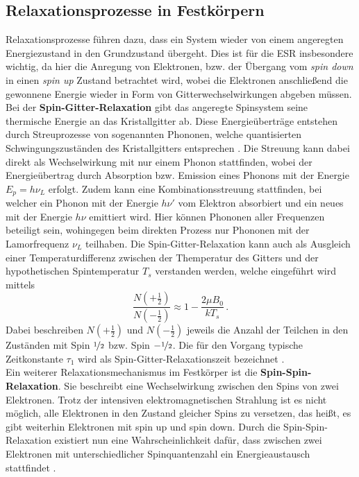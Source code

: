 \documentclass{scrartcl}
\begin{document}
\subsection{Relaxationsprozesse in Festkörpern}
Relaxationsprozesse führen dazu, dass ein System wieder von einem angeregten Energiezustand in den Grundzustand übergeht. Dies ist für die ESR insbesondere wichtig, da hier die Anregung von Elektronen, bzw. der Übergang vom \textit{spin down} in einen \textit{spin up} Zustand betrachtet wird, wobei die Elektronen anschließend die gewonnene Energie wieder in Form von Gitterwechselwirkungen abgeben müssen.  \\

Bei der \textbf{Spin-Gitter-Relaxation} gibt das angeregte Spinsystem seine thermische Energie an das Kristallgitter ab. Diese Energieüberträge entstehen durch Streuprozesse von sogenannten Phononen, welche quantisierten Schwingungszuständen des Kristallgitters entsprechen \cite{Grundlagen}. Die Streuung kann dabei direkt als Wechselwirkung mit nur einem Phonon stattfinden, wobei der Energieübertrag durch Absorption bzw. Emission eines Phonons mit der Energie $E_p = h \nu_L$ erfolgt. Zudem kann eine Kombinationsstreuung stattfinden, bei welcher ein Phonon mit der Energie $h \nu'$ vom Elektron absorbiert und ein neues mit der Energie $h \nu$ emittiert wird. Hier können Phononen aller Frequenzen beteiligt sein, wohingegen beim direkten Prozess nur Phononen mit der Lamorfrequenz $\nu_L$ teilhaben. Die Spin-Gitter-Relaxation kann auch als Ausgleich einer Temperaturdifferenz zwischen der Themperatur des Gitters und der hypothetischen Spintemperatur $T_s$ verstanden werden, welche eingeführt wird mittels
\begin{equation}
    \frac{N(+\frac{1}{2})}{N(-\frac{1}{2})} \approx 1 - \frac{2 \mu B_0}{k T_s} \, .
\end{equation}
Dabei beschreiben $N(+\frac{1}{2})$ und $N(-\frac{1}{2})$ jeweils die Anzahl der Teilchen in den Zuständen mit Spin $\nicefrac{1}{2}$ bzw. Spin $-\nicefrac{1}{2}$. Die für den Vorgang typische Zeitkonstante $\tau_1$ wird als Spin-Gitter-Relaxationszeit bezeichnet \cite{Grundlagen}. 
\\

Ein weiterer Relaxationsmechanismus im Festkörper ist die \textbf{Spin-Spin-Relaxation}. Sie beschreibt eine Wechselwirkung zwischen den Spins von zwei Elektronen. Trotz der intensiven elektromagnetischen Strahlung ist es nicht möglich, alle Elektronen in den Zustand gleicher Spins zu versetzen, das heißt, es gibt weiterhin Elektronen mit spin up und spin down. Durch die Spin-Spin-Relaxation existiert nun eine Wahrscheinlichkeit dafür, dass zwischen zwei Elektronen mit unterschiedlicher Spinquantenzahl ein Energieaustausch stattfindet \cite{Grundlagen}.
\end{document}
